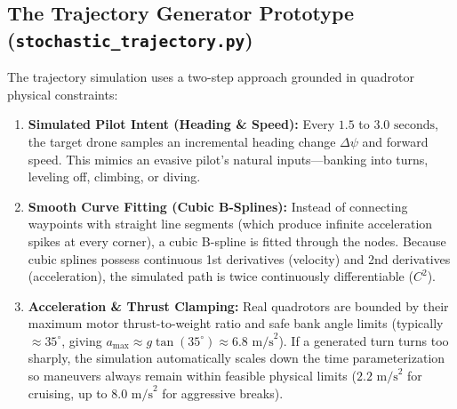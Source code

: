 \documentclass[11pt,a4paper]{article}
\begin{document}
\subsection{The Trajectory Generator Prototype (\texttt{stochastic\_trajectory.py})}
The trajectory simulation uses a two-step approach grounded in quadrotor physical constraints:
\begin{enumerate}[leftmargin=1.5em, itemsep=0.3em]
    \item \textbf{Simulated Pilot Intent (Heading \& Speed):} Every $1.5$ to $3.0\text{ seconds}$, the target drone samples an incremental heading change $\Delta \psi$ and forward speed. This mimics an evasive pilot's natural inputs---banking into turns, leveling off, climbing, or diving.
    \item \textbf{Smooth Curve Fitting (Cubic B-Splines):} Instead of connecting waypoints with straight line segments (which produce infinite acceleration spikes at every corner), a cubic B-spline is fitted through the nodes. Because cubic splines possess continuous 1st derivatives (velocity) and 2nd derivatives (acceleration), the simulated path is twice continuously differentiable ($C^2$).
    \item \textbf{Acceleration \& Thrust Clamping:} Real quadrotors are bounded by their maximum motor thrust-to-weight ratio and safe bank angle limits (typically $\approx 35^\circ$, giving $a_{\max} \approx g \tan(35^\circ) \approx 6.8\text{ m/s}^2$). If a generated turn turns too sharply, the simulation automatically scales down the time parameterization so maneuvers always remain within feasible physical limits ($2.2\text{ m/s}^2$ for cruising, up to $8.0\text{ m/s}^2$ for aggressive breaks).
\end{enumerate}
\end{document}
